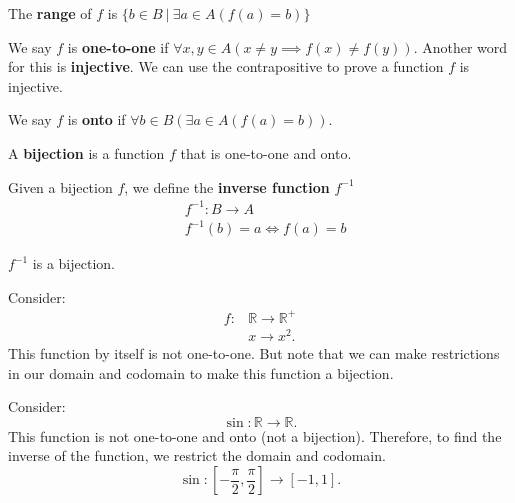 \documentclass[a4paper]{article}
\begin{document}
\begin{definition}
	The \textbf{range} of \( f \) is \( \{b \in  B ~|~ \exists  a \in  A (f(a) = b)\}   \)
\end{definition}

\begin{definition}
	We say \( f \) is \textbf{one-to-one} if \( \forall x,y \in A(x \neq  y \implies f(x) \neq f(y)) \). Another word for this is \textbf{injective}. We can use the contrapositive to prove a function \( f \) is injective.
\end{definition}

\begin{definition}
	We say \( f \) is \textbf{onto} if \( \forall b \in B (\exists a \in  A(f(a) = b)) \).
\end{definition}

\begin{definition}
	A \textbf{bijection} is a function \( f \) that is one-to-one and onto.
\end{definition}

\begin{definition}
	Given a bijection \( f \), we define the \textbf{inverse function} \( f^{-1} \)
\begin{align*}
	& f^{-1} \colon B \to A \\
	& f^{-1}(b) = a \iff f(a) = b
\end{align*}
\begin{property}
	\( f^{-1} \) is a bijection.
\end{property}
\end{definition}

\begin{eg}
	Consider:
	\begin{align*}
		f \colon & \mathbb{R} \to \mathbb{R}^+ \\
						 & x \to  x^2
	.\end{align*}
	This function by itself is not one-to-one. But note that we can make restrictions in our domain and codomain to make this function a bijection.
\end{eg}
\begin{eg}
	Consider:
	\[
		\sin \colon \mathbb{R} \to \mathbb{R}
	.\] 
	This function is not one-to-one and onto (not a bijection). Therefore, to find the inverse of the function, we restrict the domain and codomain.	\[
		\sin \colon \left[-\frac{\pi}{2}, \frac{\pi}{2}\right] \to [-1,1]
	.\] 
\end{eg}
\end{document}
